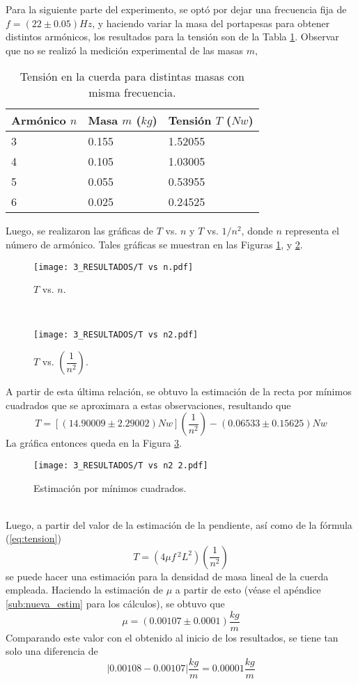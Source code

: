 \documentclass[10pt,a4paper]{article}
\begin{document}
Para la siguiente parte del experimento, se optó por dejar una frecuencia fija de $f=(22\pm 0.05) Hz$, y haciendo variar la masa del portapesas para obtener distintos armónicos, los resultados para la tensión son de la Tabla \ref{tab:cuarta}.
Observar que no se realizó la medición experimental de las masas \(m\),
\begin{table}[hbt!]
	\centering
	\caption{Tensión en la cuerda para distintas masas con misma frecuencia.}
	\begin{tabular}{|*{3}{l|}}
		\hline
		Armónico \(n\) & Masa \(m\) (\(kg\)) & Tensión \(T\) (\(Nw\)) \\ \hline
		3& 0.155 & 1.52055 \\ 		\hline
		4& 0.105 & 1.03005 \\ 		\hline
		5& 0.055 & 0.53955 \\ 		\hline
		6& 0.025 & 0.24525 \\ 		\hline
	\end{tabular}
	\label{tab:cuarta}
\end{table}
\newpage
Luego, se realizaron las gráficas de $ T $ vs. $ n $ y $ T $ vs. $ 1/n^2 $, donde $ n $ representa el número de armónico.
Tales gráficas se muestran en las Figuras \ref{fig:graf1}, y \ref{fig:graf2}.
\begin{figure}[hbt!]
	\centering
	\texttt{[image: 3\_RESULTADOS/T vs n.pdf]}
	\caption{$T$ vs. \(n\).}
	\label{fig:graf1}
\end{figure}\\
\begin{figure}[hbt!]
	\centering
	\texttt{[image: 3\_RESULTADOS/T vs n2.pdf]}
	\caption{$T$ vs. $ \left(\dfrac{1}{n^2}\right) $.}
	\label{fig:graf2}
\end{figure}
\newpage
A partir de esta última relación, se obtuvo la estimación de la recta por mínimos cuadrados que se aproximara a estas observaciones, resultando que
$$ T=[(14.90009\pm 2.29002) Nw]\left(\dfrac{1}{n^2}\right)-(0.06533\pm 0.15625) Nw $$ 
La gráfica entonces queda en la Figura \ref{fig:graf3}.
\begin{figure}[ht]
	\centering
	\texttt{[image: 3\_RESULTADOS/T vs n2 2.pdf]}
	\caption{Estimación por mínimos cuadrados.}
	\label{fig:graf3}
\end{figure}\\
Luego, a partir del valor de la estimación de la pendiente, así como de la fórmula (\ref{eq:tension})
$$T=\left(4\mu f\,^2 L^2\right)\left(\dfrac{1}{n^2}\right)$$
se puede hacer una estimación para la densidad de masa lineal de la cuerda empleada.
Haciendo la estimación de $ \mu $ a partir de esto (véase el apéndice \ref{sub:nueva_estim} para los cálculos), se obtuvo que 
$$\mu=(0.00107\pm0.0001)\dfrac{kg}{m}$$
Comparando este valor con el obtenido al inicio de los resultados, se tiene tan solo una diferencia de 
$$|0.00108-0.00107|\dfrac{kg}{m}=0.00001\dfrac{kg}{m}$$
\end{document}
